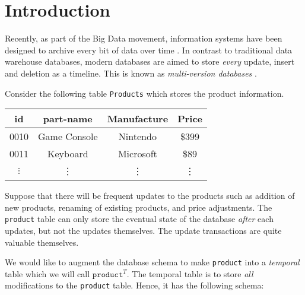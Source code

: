 \section{Introduction}

Recently, as part of the Big Data movement,
information systems have been designed to archive every bit of 
data over time \cite{tian2015prototype}. In contrast to traditional data
warehouse databases, modern
databases are aimed to store {\em every} update, insert and deletion as a timeline.
This is known as {\em multi-version databases} \cite{sadoghi2014reducing}.

\begin{example}
    Consider the following table {\tt Products} which stores the product
    information.

    \vspace{1em}

    \begin{center}
        \small
        \begin{tabular}{|c|c|c|c|} \hline
            id & part-name & Manufacture & Price \\ \hline
            0010 & Game Console &  Nintendo & \$399 \\ \hline
            0011 & Keyboard &  Microsoft & \$89 \\ \hline
            $\vdots$ & \vdots & \vdots & \vdots \\ \hline
        \end{tabular}
    \end{center}

    \vspace{1em}

    Suppose that there will be frequent updates to the products such as
    addition of new products, renaming of existing products, and price
    adjustments. The {\tt product} table can only store the eventual state of
    the database {\em after} each updates, but not the updates themselves.  The
    update transactions are quite valuable themselves.

    We would like to augment the database schema to make {\tt product} into a
    {\em temporal} table which we will call $\mathtt{product}^T$. The temporal
    table is to store {\em all} modifications to the {\tt product} table.
    Hence, it has the following schema:


\end{example}

